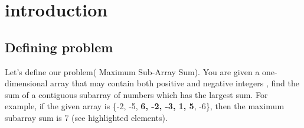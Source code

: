 \section{introduction}
\subsection{Defining problem}
Let's define our problem( Maximum Sub-Array Sum). 
You are given a one-dimensional array that 
may contain both positive and negative integers
, find the sum of a contiguous subarray of 
numbers which has the largest sum.
For example, if the given array is 
\{-2, -5, \textbf{6, -2, -3, 1, 5}, -6\}, 
then the maximum subarray sum is 7 (see 
highlighted elements).